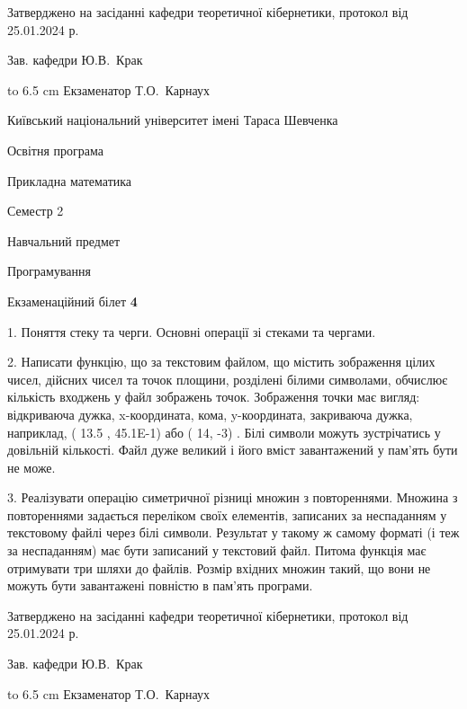 \documentclass[12pt, ukrainian]{article}
\begin{document}
{\smallskip\smallskip \begin {scriptsize} Затверджено на засіданні кафедри теоретичної кібернетики, протокол   від   25.01.2024 р.\par\smallskip\smallskip\smallskip\smallskip
{\parbox {6.5 cm} {Зав. кафедри \dotfill Ю.В.~Крак}}\hspace {0.7cm} {\hbox to 6.5 cm { Екзаменатор \dotfill Т.О.~Карнаух}} \end{scriptsize}}
\newpage
{{\begin {scriptsize}\par
{ \center  Київський національний університет імені Тараса Шевченка \par}
{\parbox {5 cm}{Освітня програма \hfill}{\parbox {7 cm}{Прикладна математика\hfill}}\parbox {6 cm}{\hfill Семестр 2}}\par
{\parbox {5 cm} {Навчальний предмет \hfill}\parbox {7 cm}{Програмування \hfill}\parbox {6cm}{\hfill}\par}\vspace{-15pt} \end{scriptsize}}{\center Екзаменаційний білет \No \textbf { 4 }\par}}
{%
1. Поняття стеку та черги. Основні операції зі стеками та чергами.%
\par
2. Написати функцію, що за текстовим файлом, що містить зображення цілих чисел, дійсних чисел та точок площини, розділені білими символами, обчислює кількість входжень у файл зображень точок. Зображення точки має вигляд: відкриваюча дужка, x-координата, кома, y-координата, закриваюча дужка, наприклад, ( 13.5 , 45.1E-1) або ( 14, -3) . Білі символи можуть зустрічатись у довільній кількості. Файл дуже великий і його вміст завантажений у пам'ять бути не може.

\par
3. Реалізувати операцію симетричної різниці множин з повтореннями. Множина з повтореннями задається переліком своїх елементів, записаних за неспаданням у текстовому файлі через білі символи. Результат у такому ж самому форматі (і теж за неспаданням) має бути записаний у текстовий файл. Питома функція має отримувати три шляхи до файлів. Розмір вхідних множин такий, що вони не можуть бути завантажені повністю в пам’ять програми.

}
{\smallskip\smallskip \begin {scriptsize} Затверджено на засіданні кафедри теоретичної кібернетики, протокол   від   25.01.2024 р.\par\smallskip\smallskip\smallskip\smallskip
{\parbox {6.5 cm} {Зав. кафедри \dotfill Ю.В.~Крак}}\hspace {0.7cm} {\hbox to 6.5 cm { Екзаменатор \dotfill Т.О.~Карнаух}} \end{scriptsize}}
\end{document}
